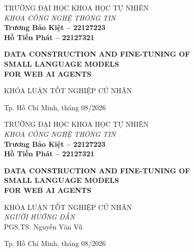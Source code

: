 \begin{titlepage}

\begin{center}
TRƯỜNG ĐẠI HỌC KHOA HỌC TỰ NHIÊN\\
\textit{KHOA CÔNG NGHỆ THÔNG TIN}\\[2cm]

{ \Large \bfseries Trương Bảo Kiệt -- 22127223\\
Hồ Tiến Phát -- 22127321\\[2cm] }

{ \Large \bfseries DATA CONSTRUCTION AND FINE-TUNING OF \\
SMALL LANGUAGE MODELS \\
FOR WEB AI AGENTS \\[3cm]}

\large KHÓA LUẬN TỐT NGHIỆP CỬ NHÂN\\[2cm]


\vfill
Tp. Hồ Chí Minh, tháng 08/2026

\end{center}

\pagebreak

\begin{center}

TRƯỜNG ĐẠI HỌC KHOA HỌC TỰ NHIÊN\\
\textit{KHOA CÔNG NGHỆ THÔNG TIN}\\[2cm]

{\large \bfseries Trương Bảo Kiệt -- 22127223\\
Hồ Tiến Phát -- 22127321\\}

{ \Large \bfseries DATA CONSTRUCTION AND FINE-TUNING OF \\
SMALL LANGUAGE MODELS \\
FOR WEB AI AGENTS \\[2cm]}

\large KHÓA LUẬN TỐT NGHIỆP CỬ NHÂN\\[2cm]

\textit{NGƯỜI HƯỚNG DẪN}\\
PGS.TS. Nguyễn Văn Vũ\\


\vfill
Tp. Hồ Chí Minh, tháng 08/2026

\end{center}

\end{titlepage}
